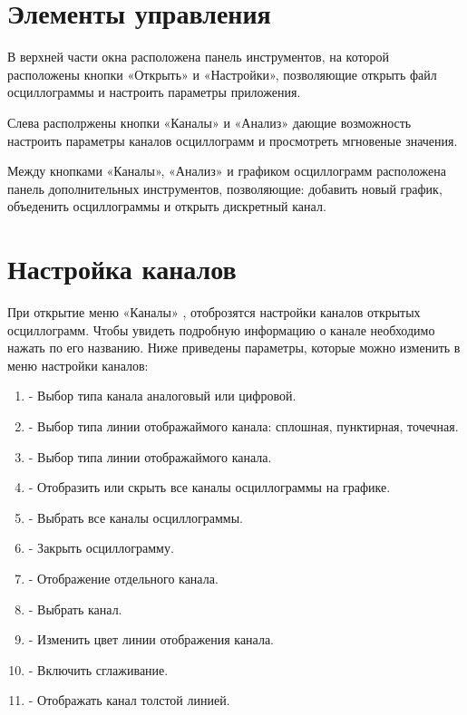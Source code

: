 \documentclass[a4paper,12pt]{article}
\begin{document}
\section*{\hspace{.5cm}Элементы управления }
\hspace{.5cm}В  верхней  части  окна  расположена  панель  инструментов,  на  которой расположены  кнопки «Открыть» и «Настройки», позволяющие открыть файл осциллограммы и настроить параметры приложения.

Слева располржены кнопки «Каналы» и «Анализ» дающие возможность настроить параметры каналов осциллограмм и просмотреть мгновеные значения. 

Между кнопками «Каналы», «Анализ» и графиком осциллограмм расположена панель дополнительных инструментов, позволяющие: добавить новый график, объеденить осциллограммы и открыть дискретный канал.

\section*{\hspace{.5cm}Настройка каналов }
\hspace{.5cm}При открытие меню «Каналы» , отоброзятся настройки каналов открытых осциллограмм. Чтобы увидеть подробную информацию о канале необходимо нажать по его названию. Ниже приведены параметры, которые можно изменить в меню настройки каналов:

\begin{enumerate}
\item - Выбор типа канала аналоговый или цифровой. 
\item - Выбор типа линии отображаймого канала: сплошная, пунктирная, точечная.
\item - Выбор типа линии отображаймого канала.
\item - Отобразить или скрыть все каналы осциллограммы на графике.
\item - Выбрать все каналы осциллограммы.
\item - Закрыть осциллограмму.
\item - Отображение отдельного канала. 
\item - Выбрать канал.
\item - Изменить цвет линии отображения канала.
\item - Включить сглаживание.
\item - Отображать канал толстой линией.
\end {enumerate}
\end{document}
